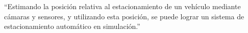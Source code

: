 \noindent
``Estimando la posición relativa al estacionamiento de un vehículo mediante cámaras y sensores,
y utilizando esta posición, se puede lograr un sistema de estacionamiento automático en simulación.''

